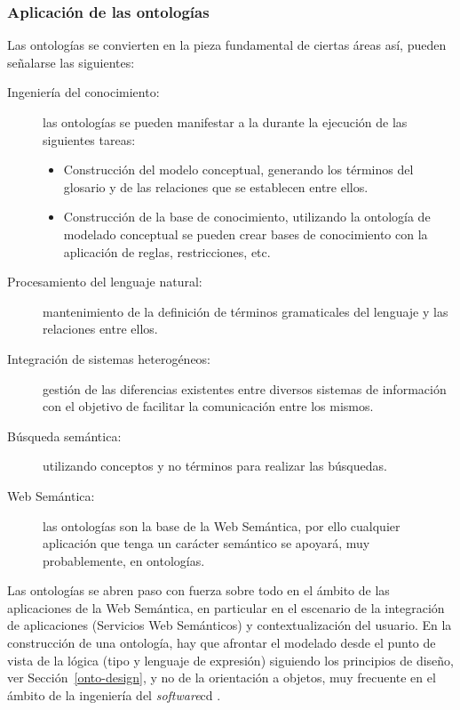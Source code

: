 \subsubsection{Aplicación de las ontologías}
Las ontologías se convierten en la pieza fundamental de ciertas áreas así, pueden señalarse las 
siguientes:

\begin{description}
\item[Ingeniería del conocimiento:] las ontologías se pueden manifestar a la
durante la ejecución de las siguientes tareas:
\begin{itemize}
  \item Construcción del modelo conceptual, generando los términos del glosario
  y de las relaciones que se establecen entre ellos.
  \item Construcción de la base de conocimiento, utilizando la ontología de
  modelado conceptual se pueden crear bases de conocimiento con la aplicación de
  reglas, restricciones, etc.
\end{itemize}

\item[Procesamiento del lenguaje natural:] mantenimiento de la definición de términos
gramaticales del lenguaje y las relaciones entre ellos.

\item[Integración de sistemas heterogéneos:] gestión de las diferencias
existentes entre diversos sistemas de información con el objetivo de facilitar
la comunicación entre los mismos.
\item[Búsqueda semántica:] utilizando conceptos y no términos para realizar las
búsquedas. 

\item[Web Semántica:] las ontologías son la base de la Web Semántica, por ello
cualquier aplicación que tenga un carácter semántico se apoyará, muy
probablemente, en ontologías.
\end{description}


Las ontologías se abren paso con fuerza sobre todo en el ámbito de las
aplicaciones de la Web Semántica, en particular en el escenario de la
integración de aplicaciones (Servicios Web Semánticos) y contextualización del
usuario. En la construcción de una ontología, hay que afrontar el modelado desde el
punto de vista de la lógica (tipo y lenguaje de expresión) siguiendo los
principios de diseño, ver Sección~\ref{onto-design}, y no de la orientación a objetos, muy frecuente en el ámbito de la ingeniería del \textit{software}cd .  
